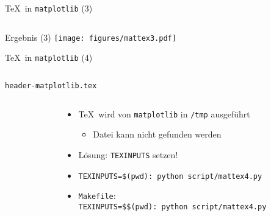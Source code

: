 \begin{frame}[fragile]{\TeX\ in \texttt{matplotlib} (3)}
  \inputminted{python}{script/mattex3.py}
\end{frame}

\AddToShipoutPictureFG*{\ShowFramePicture}
\begin{frame}{Ergebnis (3)}%
  \centering%
  \texttt{[image: figures/mattex3.pdf]}%
\end{frame}

\begin{frame}[fragile]{\TeX\ in \texttt{matplotlib} (4)}
  \inputminted{python}{script/mattex4.py}
\end{frame}

\begin{frame}[fragile]{\texttt{header-matplotlib.tex}}
  \begin{columns}[onlytextwidth]%
    \begin{column}{0.35\textwidth}%
      \small
      \inputminted{latex}{header-matplotlib.tex}
    \end{column}%
    \hfill%
    \begin{column}{0.645\textwidth}%
      \begin{itemize}
        \item \TeX\ wird von \texttt{matplotlib} in \texttt{/tmp} ausgeführt
          \begin{itemize}
            \item Datei kann nicht gefunden werden
          \end{itemize}
        \item Lösung: \texttt{TEXINPUTS} setzen!
        \item \texttt{TEXINPUTS=\$(pwd): python script/mattex4.py}
        \item \texttt{Makefile}:\\
          \texttt{TEXINPUTS=\$\$(pwd): python script/mattex4.py}
      \end{itemize}
    \end{column}%
  \end{columns}%
\end{frame}

%

